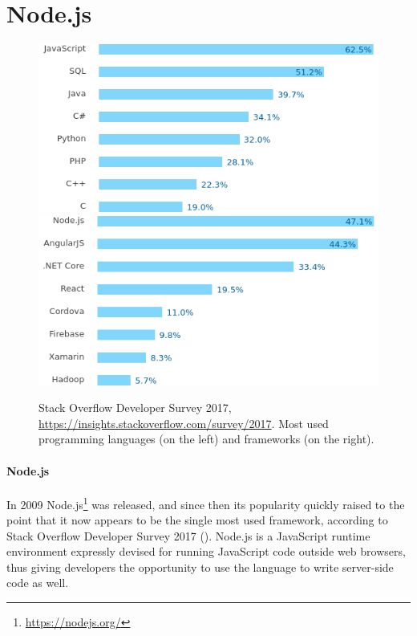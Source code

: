 \section{Node.js}
\label{sec:node}
\begin{figure}
	\includegraphics[width=.5\textwidth]{fig/languages}
	\includegraphics[width=.5\textwidth]{fig/frameworks}
	\caption{Stack Overflow Developer Survey 2017, \url{https://insights.stackoverflow.com/survey/2017}. Most used programming languages (on the left) and frameworks (on the right).}
	\label{fig:popularity}
\end{figure}


\paragraph{Node.js}
In 2009 Node.js\footnote{\url{https://nodejs.org/}} was released, and since then its popularity quickly raised to the point that it now appears to be the single most used framework, according to Stack Overflow Developer Survey 2017 ().
Node.js is a JavaScript runtime environment expressly devised for running JavaScript code outside web browsers, thus giving developers the opportunity to use the language to write server-side code as well.

